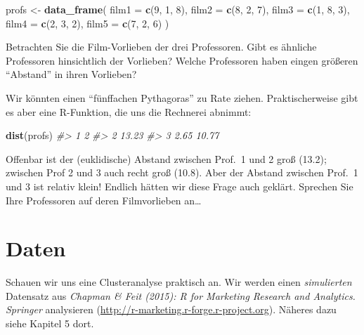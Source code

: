 \documentclass[12pt,ngerman,]{book}
\newenvironment{Shaded}{\begin{snugshade}}{\end{snugshade}}
\newcommand{\KeywordTok}[1]{\textcolor[rgb]{0.13,0.29,0.53}{\textbf{{#1}}}}
\newcommand{\DataTypeTok}[1]{\textcolor[rgb]{0.13,0.29,0.53}{{#1}}}
\newcommand{\DecValTok}[1]{\textcolor[rgb]{0.00,0.00,0.81}{{#1}}}
\newcommand{\StringTok}[1]{\textcolor[rgb]{0.31,0.60,0.02}{{#1}}}
\newcommand{\CommentTok}[1]{\textcolor[rgb]{0.56,0.35,0.01}{\textit{{#1}}}}
\newcommand{\NormalTok}[1]{{#1}}
\renewenvironment{Shaded}{\begin{kframe}}{\end{kframe}}
\begin{document}
\begin{Shaded}
\begin{Highlighting}[]
\NormalTok{profs <-}\StringTok{ }\KeywordTok{data_frame}\NormalTok{(}
  \DataTypeTok{film1 =} \KeywordTok{c}\NormalTok{(}\DecValTok{9}\NormalTok{, }\DecValTok{1}\NormalTok{, }\DecValTok{8}\NormalTok{),}
  \DataTypeTok{film2 =} \KeywordTok{c}\NormalTok{(}\DecValTok{8}\NormalTok{, }\DecValTok{2}\NormalTok{, }\DecValTok{7}\NormalTok{),}
  \DataTypeTok{film3 =} \KeywordTok{c}\NormalTok{(}\DecValTok{1}\NormalTok{, }\DecValTok{8}\NormalTok{, }\DecValTok{3}\NormalTok{),}
  \DataTypeTok{film4 =} \KeywordTok{c}\NormalTok{(}\DecValTok{2}\NormalTok{, }\DecValTok{3}\NormalTok{, }\DecValTok{2}\NormalTok{),}
  \DataTypeTok{film5 =} \KeywordTok{c}\NormalTok{(}\DecValTok{7}\NormalTok{, }\DecValTok{2}\NormalTok{, }\DecValTok{6}\NormalTok{)}
\NormalTok{)}
\end{Highlighting}
\end{Shaded}

Betrachten Sie die Film-Vorlieben der drei Professoren. Gibt es ähnliche
Professoren hinsichtlich der Vorlieben? Welche Professoren haben eingen
größeren ``Abstand'' in ihren Vorlieben?

Wir könnten einen ``fünffachen Pythagoras'' zu Rate ziehen.
Praktischerweise gibt es aber eine R-Funktion, die uns die Rechnerei
abnimmt:

\begin{Shaded}
\begin{Highlighting}[]
\KeywordTok{dist}\NormalTok{(profs)}
\CommentTok{#>       1     2}
\CommentTok{#> 2 13.23      }
\CommentTok{#> 3  2.65 10.77}
\end{Highlighting}
\end{Shaded}

Offenbar ist der (euklidische) Abstand zwischen Prof.~1 und 2 groß
(13.2); zwischen Prof 2 und 3 auch recht groß (10.8). Aber der Abstand
zwischen Prof.~1 und 3 ist relativ klein! Endlich hätten wir diese Frage
auch geklärt. Sprechen Sie Ihre Professoren auf deren Filmvorlieben
an\ldots{}

\section{Daten}\label{daten}

Schauen wir uns eine Clusteranalyse praktisch an. Wir werden einen
\emph{simulierten} Datensatz aus \emph{Chapman \& Feit (2015): R for
Marketing Research and Analytics. Springer} analysieren
(\url{http://r-marketing.r-forge.r-project.org}). Näheres dazu siehe
Kapitel 5 dort.
\end{document}

